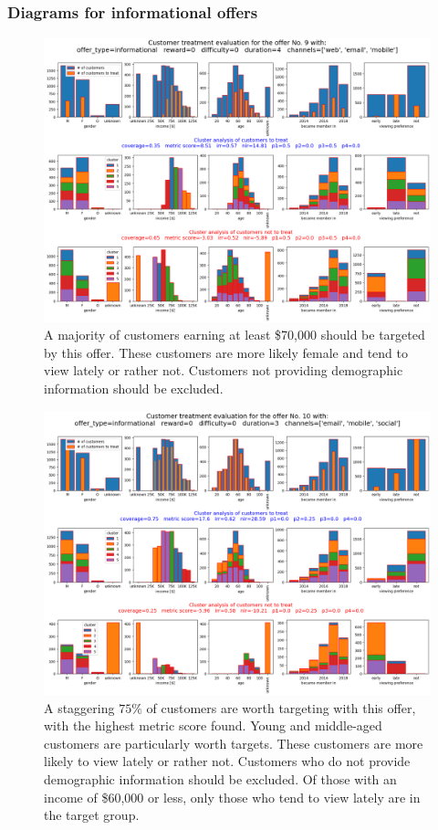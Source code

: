 \documentclass[11pt]{article} %
\begin{document}
\subsubsection{Diagrams for informational offers}
\begin{figure}[H]
\includegraphics[height=0.5\textheight]{results/results9.png}
\caption{A majority of customers earning at least \$70,000 should be targeted by this offer. These customers are more likely female and tend to view lately or rather not. Customers not providing demographic information should be excluded.}
\end{figure}
\begin{figure}[H]
\includegraphics[height=0.5\textheight]{results/results10.png}
\caption{A staggering $75\%$ of customers are worth targeting with this offer, with the highest metric score found. Young and middle-aged customers are particularly worth targets. These customers are more likely to view lately or rather not. Customers who do not provide demographic information should be excluded. Of those with an income of \$60,000 or less, only those who tend to view lately are in the target group.}
\end{figure}
\end{document}
